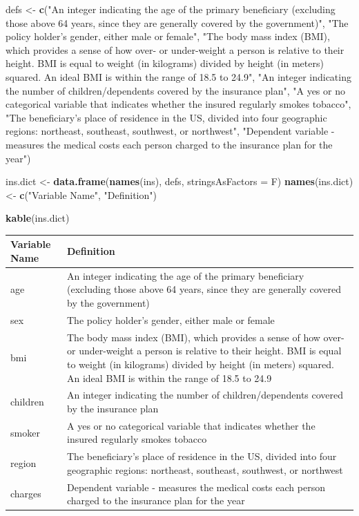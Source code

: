 \documentclass[]{article}
\newenvironment{Shaded}{\begin{snugshade}}{\end{snugshade}}
\newcommand{\KeywordTok}[1]{\textcolor[rgb]{0.13,0.29,0.53}{\textbf{#1}}}
\newcommand{\DataTypeTok}[1]{\textcolor[rgb]{0.13,0.29,0.53}{#1}}
\newcommand{\StringTok}[1]{\textcolor[rgb]{0.31,0.60,0.02}{#1}}
\newcommand{\NormalTok}[1]{#1}
\begin{document}
\begin{Shaded}
\begin{Highlighting}[]
\NormalTok{defs <-}\StringTok{ }\KeywordTok{c}\NormalTok{(}\StringTok{"An integer indicating the age of the primary beneficiary (excluding those above 64 years, since they are generally covered by the government)"}\NormalTok{, }
          \StringTok{"The policy holder's gender, either male or female"}\NormalTok{, }
          \StringTok{"The body mass index (BMI), which provides a sense of how over- or under-weight a person is relative to their height. BMI is equal to weight (in kilograms) divided by height (in meters) squared. An ideal BMI is within the range of 18.5 to 24.9"}\NormalTok{, }
          \StringTok{"An integer indicating the number of children/dependents covered by the insurance plan"}\NormalTok{, }
          \StringTok{"A yes or no categorical variable that indicates whether the insured regularly smokes tobacco"}\NormalTok{, }
          \StringTok{"The beneficiary's place of residence in the US, divided into four geographic regions: northeast, southeast, southwest, or northwest"}\NormalTok{, }
          \StringTok{"Dependent variable - measures the medical costs each person charged to the insurance plan for the year"}\NormalTok{)}

\NormalTok{ins.dict <-}\StringTok{ }\KeywordTok{data.frame}\NormalTok{(}\KeywordTok{names}\NormalTok{(ins), defs, }\DataTypeTok{stringsAsFactors =}\NormalTok{ F)}
\KeywordTok{names}\NormalTok{(ins.dict) <-}\StringTok{ }\KeywordTok{c}\NormalTok{(}\StringTok{"Variable Name"}\NormalTok{, }\StringTok{"Definition"}\NormalTok{)}

\KeywordTok{kable}\NormalTok{(ins.dict)}
\end{Highlighting}
\end{Shaded}

\begin{longtable}[]{@{}ll@{}}
\toprule
Variable Name & Definition\tabularnewline
\midrule
\endhead
age & An integer indicating the age of the primary beneficiary
(excluding those above 64 years, since they are generally covered by the
government)\tabularnewline
sex & The policy holder's gender, either male or female\tabularnewline
bmi & The body mass index (BMI), which provides a sense of how over- or
under-weight a person is relative to their height. BMI is equal to
weight (in kilograms) divided by height (in meters) squared. An ideal
BMI is within the range of 18.5 to 24.9\tabularnewline
children & An integer indicating the number of children/dependents
covered by the insurance plan\tabularnewline
smoker & A yes or no categorical variable that indicates whether the
insured regularly smokes tobacco\tabularnewline
region & The beneficiary's place of residence in the US, divided into
four geographic regions: northeast, southeast, southwest, or
northwest\tabularnewline
charges & Dependent variable - measures the medical costs each person
charged to the insurance plan for the year\tabularnewline
\bottomrule
\end{longtable}
\end{document}
